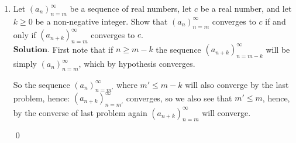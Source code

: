 \documentclass{article}
\theoremstyle{remark}
\begin{document}
\begin{enumerate}
            \item Let \( (a_n)_{n=m}^{\infty} \) be a sequence of real numbers, let \( c \) be a real number, and let \( k \geq 0 \) be a non-negative integer. Show that \( (a_n)_{n=m}^{\infty} \) converges to \( c \) if and only if \( (a_{n+k})_{n=m}^{\infty} \) converges to \( c \).\\
            $\textbf{Solution.}$
            First note that if $n \geq m-k$ the sequence $(a_{n+k})_{n=m-k}^{\infty}$ will be simply $(a_n)_{n=m}^{\infty}$, which by hypothesis converges.

            So the sequence $(a_n)_{n=m'}^{\infty}$ where $m' \leq m-k$ will also converge by the last problem,
            hence: $(a_{n+k})_{n=m'}^{\infty}$ converges, so we also see that $m' \leq m$, hence, by the converse of last problem again $(a_{n+k})_{n=m}^{\infty}$ will converge.
            \begin{flushright}
                \qed
            \end{flushright}



        \end{enumerate}
\end{document}
